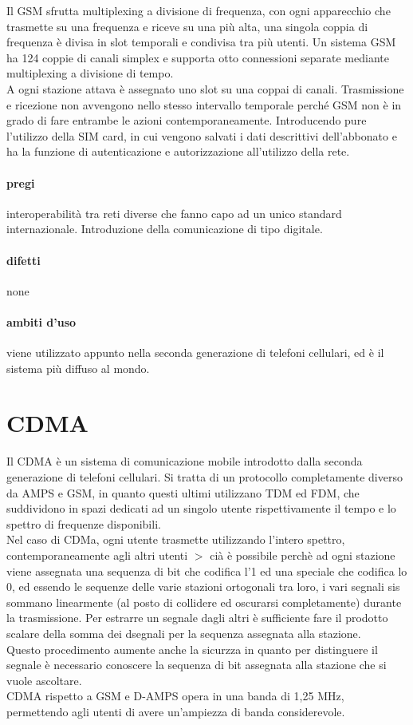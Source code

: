 \documentclass{article}
\begin{document}
Il GSM sfrutta multiplexing a divisione di frequenza, con ogni apparecchio che
trasmette su una frequenza e riceve su una più alta, una singola coppia di
frequenza è divisa in slot temporali e condivisa tra più utenti. Un sistema GSM
ha 124 coppie di canali simplex e supporta otto connessioni separate mediante
multiplexing a divisione di tempo.\\
A ogni stazione attava è assegnato uno slot su una coppai di canali.
Trasmissione e ricezione non avvengono nello stesso intervallo temporale perché
GSM non è in grado di fare entrambe le azioni contemporaneamente. Introducendo
pure l'utilizzo della SIM card, in cui vengono salvati i dati descrittivi
dell'abbonato e ha la funzione di autenticazione e autorizzazione all'utilizzo
della rete.

\paragraph{pregi} interoperabilità tra reti diverse che fanno capo ad un unico
standard internazionale. Introduzione della comunicazione di tipo digitale.

\paragraph{difetti} none

\paragraph{ambiti d'uso} viene utilizzato appunto nella seconda generazione di
telefoni cellulari, ed è il sistema più diffuso al mondo.

\section{CDMA} 

Il CDMA è un sistema di comunicazione mobile introdotto dalla seconda
generazione di telefoni cellulari. Si tratta di un protocollo completamente
diverso da AMPS e GSM, in quanto questi ultimi utilizzano TDM ed FDM, che
suddividono in spazi dedicati ad un singolo utente rispettivamente il tempo e lo
spettro di frequenze disponibili.\\
Nel caso di CDMa, ogni utente trasmette utilizzando l'intero spettro,
contemporaneamente agli altri utenti $>$ cià è possibile perchè ad ogni stazione
viene assegnata una sequenza di bit che codifica l'1 ed una speciale che
codifica lo 0, ed essendo le sequenze delle varie stazioni ortogonali tra loro,
i vari segnali sis sommano linearmente (al posto di collidere ed oscurarsi
completamente) durante la trasmissione. Per estrarre un segnale dagli altri è
sufficiente fare il prodotto scalare della somma dei dsegnali per la sequenza
assegnata alla stazione.\\
Questo procedimento aumente anche la sicurzza in quanto per distinguere il
segnale è necessario conoscere la sequenza di bit assegnata alla stazione che si
vuole ascoltare.\\
CDMA rispetto a GSM e D-AMPS opera in una banda di 1,25 MHz, permettendo agli
utenti di avere un'ampiezza di banda considerevole.
\end{document}
